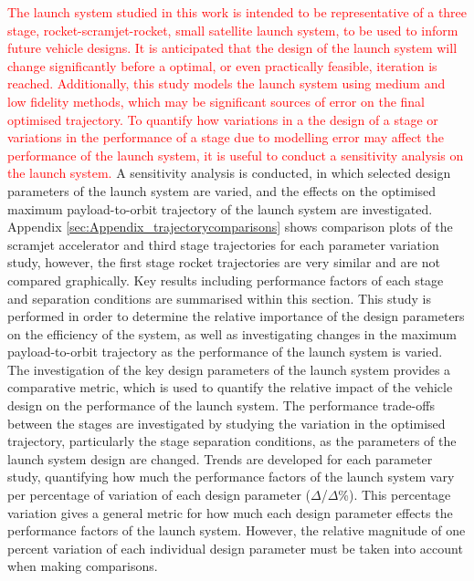 \textcolor{red}{The launch system studied in this work is intended to be representative of a three stage, rocket-scramjet-rocket, small satellite launch system, to be used to inform future vehicle designs. It is anticipated that the design of the launch system will change significantly before a optimal, or even practically feasible, iteration is reached. Additionally, this study models the launch system using medium and low fidelity methods, which may be significant sources of error on the final optimised trajectory.  
	To quantify how variations in a the design of a stage or variations in the performance of a stage due to modelling error may affect the performance of the launch system, it is useful to conduct a sensitivity analysis on the launch system.}
A sensitivity analysis is conducted, in which selected design parameters of the launch system are varied, and the effects on the optimised maximum payload-to-orbit trajectory of the launch system are investigated. Appendix \ref{sec:Appendix_trajectorycomparisons} shows comparison plots of the scramjet accelerator and third stage trajectories for each parameter variation study, however, the first stage rocket trajectories are very similar and are not compared graphically. Key results including performance factors of each stage and separation conditions are summarised within this section.
This study is performed in order to determine the relative importance of the design parameters on the efficiency of the system, as well as investigating changes in the maximum payload-to-orbit trajectory as the performance of the launch system is varied. The investigation of the key design parameters of the launch system provides a comparative metric, which is used to quantify the relative impact of the vehicle design on the performance of the launch system. The performance trade-offs between the stages are investigated by studying the variation in the optimised trajectory, particularly the stage separation conditions, as the parameters of the launch system design are changed. 
Trends are developed for each parameter study, quantifying how much the performance factors of the launch system vary per percentage of variation of each design parameter ($\Delta$/$\Delta$\%). This percentage variation gives a general metric for how much each design parameter effects the performance factors of the launch system. However, the relative magnitude of one percent variation of each individual design parameter must be taken into account when making comparisons. 

